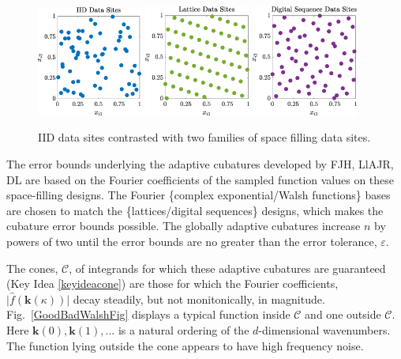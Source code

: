 \documentclass[11pt]{NSFamsart}
\newcommand{\hf}{\widehat{f}}
\newcommand{\bk}{{\boldsymbol{k}}}
\newcommand{\calc}{{\mathcal{C}}}
\newcommand{\bigabs}[1]{\ensuremath{\bigl \lvert #1 \bigr \rvert}}
\begin{document}
\begin{figure}[h] %
	\centering
	\includegraphics[width = 0.31\textwidth]{ProgramsImages/IIDPoints.eps} \quad
	\includegraphics[width = 0.31\textwidth]{ProgramsImages/ShiftedLatticePoints.eps}  \quad
	\includegraphics[width = 0.31\textwidth]{ProgramsImages/SSobolPoints.eps} 
	
	\caption{IID data sites contrasted with two families of space filling data sites.\label{PtsFig}}
\end{figure}

The error bounds underlying the adaptive cubatures developed by FJH, LlAJR, DL are based on the Fourier coefficients of the sampled function values on these space-filling designs.  The Fourier  \{complex exponential/Walsh functions\} bases are chosen to match the \{lattices/digital sequences\}  designs, which makes the cubature error bounds possible.  The globally adaptive cubatures increase $n$ by powers of two until the error bounds are no greater than the error tolerance, $\varepsilon$.

The cones, $\calc$, of integrands for which these adaptive cubatures are guaranteed (Key Idea \ref{keyideacone})  are those for which  the Fourier coefficients, $\bigabs{\hf(\bk(\kappa))}$ decay steadily, but not monitonically, in magnitude.  Fig.\ \ref{GoodBadWalshFig} displays a typical function inside $\calc$ and one outside $\calc$. Here $\bk(0), \bk(1), \ldots$ is a natural ordering of the $d$-dimensional wavenumbers.  The function lying outside the cone appears to have high frequency noise. 
\end{document}
